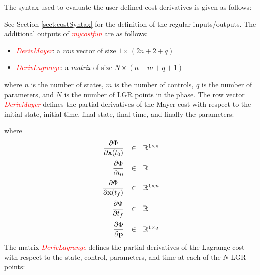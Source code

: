 \documentclass[10pt]{article}
\newcommand{\slred}[1]{\textcolor{red}{\sl #1}}
\begin{document}
The syntax used to evaluate the user-defined cost derivatives is given as follows:
\begin{center}
\end{center}
See Section \ref{sect:costSyntax} for the definition of the regular inputs/outputs.
The additional outputs of \slred{mycostfun} are as follows:
\begin{itemize}
  \item \slred{DerivMayer}: a {\em row} vector of size $1\times (2n+2+q)$
  \item \slred{DerivLagrange}: a {\em matrix} of size $N\times (n+m+q+1)$
\end{itemize}
where $n$ is the number of states, $m$ is the number of controls, $q$
is the number of parameters, and $N$ is the number of LGR points in the
phase. The row vector \slred{DerivMayer} defines the partial
derivatives of the Mayer cost with respect to the initial state,
initial time, final state, final time, and finally the parameters: 
\begin{center}
\end{center}
where 
\begin{equation}
 \begin{array}{rcl}
   \displaystyle   \pd{\Phi}{\bfx(t_0)} & \in & \mathbb{R}^{1\times n}\vspace{6pt}\\
   \displaystyle  \pd{\Phi}{t_0} & \in & \mathbb{R} \vspace{6pt}\\ 
   \displaystyle   \pd{\Phi}{\bfx(t_f)} & \in & \mathbb{R}^{1\times n}\vspace{6pt}\\
   \displaystyle  \pd{\Phi}{t_f} & \in & \mathbb{R}\vspace{6pt}\\ 
   \displaystyle  \pd{\Phi}{\bfp} & \in & \mathbb{R}^{1\times q}
\end{array}
\end{equation} 
The matrix \slred{DerivLagrange} defines the partial derivatives of the Lagrange cost with respect to the state, control, parameters, and time at each of the $N$ LGR points:
\begin{center}
\end{center}
\end{document}
